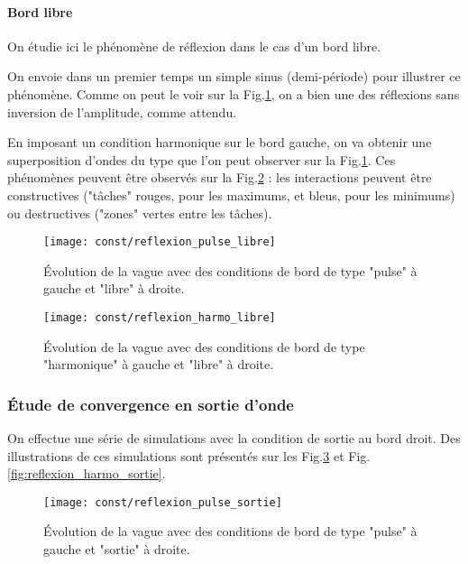 \documentclass[a4paper,12pt,oneside]{article}
\begin{document}
\paragraph{Bord libre} On étudie ici le phénomène de réflexion dans le cas d'un bord libre. 

On envoie dans un premier temps un simple sinus (demi-période) pour illustrer ce phénomène. Comme on peut le voir sur la Fig.\ref{fig:reflexion_pulse_libre}, on a bien une des réflexions sans inversion de l'amplitude, comme attendu.

En imposant un condition harmonique sur le bord gauche, on va obtenir une superposition d'ondes du type que l'on peut observer sur la Fig.\ref{fig:reflexion_pulse_libre}. Ces phénomènes peuvent être observés sur la Fig.\ref{fig:reflexion_harmo_libre} : les interactions peuvent être constructives ("tâches" rouges, pour les maximums, et bleus, pour les minimums) ou destructives ("zones" vertes entre les tâches).

\begin{figure}[H]
    \centering
    \texttt{[image: const/reflexion\_pulse\_libre]}
    \caption{Évolution de la vague avec des conditions de bord de type "pulse" à gauche et "libre" à droite.}
    \label{fig:reflexion_pulse_libre}
\end{figure}

\begin{figure}[H]
    \centering
    \texttt{[image: const/reflexion\_harmo\_libre]}
    \caption{Évolution de la vague avec des conditions de bord de type "harmonique" à gauche et "libre" à droite.}
    \label{fig:reflexion_harmo_libre}
\end{figure}



\subsubsection{Étude de convergence en sortie d'onde}

On effectue une série de simulations avec la condition de sortie au bord droit. Des illustrations de ces simulations sont présentés sur les Fig.\ref{fig:reflexion_pulse_sortie} et Fig.\ref{fig:reflexion_harmo_sortie}.

\begin{figure}[H]
    \centering
    \texttt{[image: const/reflexion\_pulse\_sortie]}
    \caption{Évolution de la vague avec des conditions de bord de type "pulse" à gauche et "sortie" à droite.}
    \label{fig:reflexion_pulse_sortie}
\end{figure}
\end{document}
